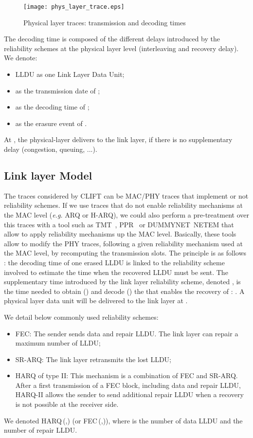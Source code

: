 \documentclass[conference,letterpaper]{IEEEtran}
\begin{document}
\begin{figure}[!ht]
    \begin{center}
	\texttt{[image: phys\_layer\_trace.eps]}
	\caption{Physical layer traces: transmission and decoding times}
	\label{fig::phys_trace_layer}
    \end{center}
\end{figure}

The decoding time is composed of the different delays introduced by the reliability schemes at the physical layer level (interleaving and recovery delay). We denote: 
\begin{itemize}
\item LLDU as one Link Layer Data Unit;
\item  as the transmission date of ;
\item  as the decoding time of ;
\item  as the erasure event of .
\end{itemize} 
At , the physical-layer delivers  to the link layer, if there is no supplementary delay (congestion, queuing, ...). 

\subsection{Link layer Model}
\label{subsec::link_layer_schemes}

The traces considered by CLIFT can be MAC/PHY traces that implement or not reliability schemes. If we use traces that do not enable reliability mechanisms at the MAC level (\textit{e.g.} ARQ or H-ARQ), we could also perform a pre-treatment over this traces with a tool such as TMT~\cite{link_soft_tmt}, PPR~\cite{link_soft_ppr} or DUMMYNET~NETEM\cite{link_soft_dummynet} that allow to apply reliability mechanisms up the MAC level. Basically, these tools allow to modify the PHY traces, following a given reliability mechanism used at the MAC level, by recomputing the transmission slots.
The principle is as follows : the decoding time of one erased LLDU is linked to the reliability scheme involved to estimate the time when the recovered LLDU must be sent. The supplementary time introduced by the link layer reliability scheme, denoted , is the time needed to obtain () and decode () the  that enables the recovery of : . A physical layer data unit will be delivered to the link layer at .
 
We detail below commonly used reliability schemes:
\begin{itemize}
\item FEC: The sender sends  data and  repair LLDU. The link layer can repair a maximum number of  LLDU;
\item SR-ARQ: The link layer retransmits the lost LLDU;
\item HARQ of type II: This mechanism is a combination of FEC and SR-ARQ. After a first transmission of a FEC block, including data and repair LLDU, HARQ-II allows the sender to send additional repair LLDU when a recovery is not possible at the receiver side.
\end{itemize}
We denoted HARQ\,(,) (or FEC\,(,)), where  is the number of data LLDU and  the number of repair LLDU.
\end{document}

